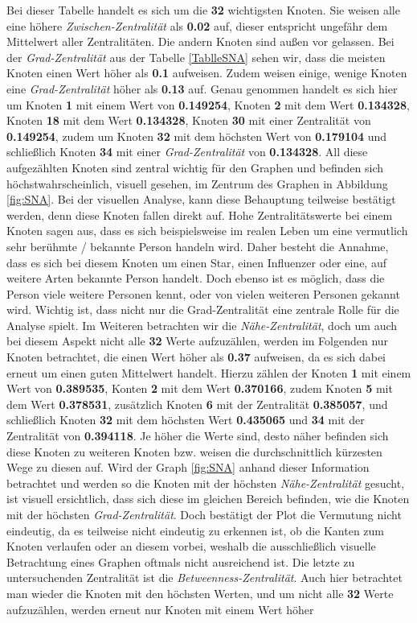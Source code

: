 \FloatBarrier
Bei dieser Tabelle handelt es sich um die \textbf{32} wichtigsten Knoten. Sie weisen alle eine höhere \textit{Zwischen-Zentralität} als \textbf{0.02} auf, dieser entspricht ungefähr dem Mittelwert aller Zentralitäten. Die andern Knoten sind außen vor gelassen.
Bei der \textit{Grad-Zentralität} aus der Tabelle \ref{TablleSNA} sehen wir, dass die meisten Knoten einen Wert höher als \textbf{0.1} aufweisen. Zudem weisen einige, wenige Knoten eine \textit{Grad-Zentralität} höher als \textbf{0.13} auf. Genau genommen handelt es sich hier um Knoten \textbf{1} mit einem Wert von \textbf{0.149254}, Knoten \textbf{2} mit dem Wert \textbf{0.134328}, Knoten \textbf{18} mit dem Wert \textbf{0.134328}, Knoten \textbf{30} mit einer Zentralität von \textbf{0.149254}, zudem um Knoten \textbf{32} mit dem höchsten Wert von \textbf{0.179104} und schließlich Knoten \textbf{34} mit einer \textit{Grad-Zentralität} von \textbf{0.134328}. All diese aufgezählten Knoten sind zentral wichtig für den Graphen und befinden sich höchstwahrscheinlich, visuell gesehen, im Zentrum des Graphen in Abbildung \ref{fig:SNA}. Bei der visuellen Analyse, kann diese Behauptung teilweise bestätigt werden, denn diese Knoten fallen direkt auf. Hohe Zentralitätswerte bei einem Knoten sagen aus, dass es sich beispielsweise im realen Leben um eine vermutlich sehr berühmte / bekannte Person handeln wird. Daher besteht die Annahme, dass es sich bei diesem Knoten um einen Star, einen Influenzer oder eine, auf weitere Arten bekannte Person handelt. Doch ebenso ist es möglich, dass die Person viele weitere Personen kennt, oder von vielen weiteren Personen gekannt wird. Wichtig ist, dass nicht nur die Grad-Zentralität eine zentrale Rolle für die Analyse spielt. Im Weiteren betrachten wir die \textit{Nähe-Zentralität}, doch um auch bei diesem Aspekt nicht alle \textbf{32} Werte aufzuzählen, werden im Folgenden nur Knoten betrachtet, die einen Wert höher als \textbf{0.37} aufweisen, da es sich dabei erneut um einen guten Mittelwert handelt. Hierzu zählen der Knoten \textbf{1} mit einem Wert von \textbf{0.389535}, Konten \textbf{2} mit dem Wert \textbf{0.370166}, zudem Knoten \textbf{5} mit dem Wert \textbf{0.378531}, zusätzlich Knoten \textbf{6} mit der Zentralität \textbf{0.385057}, und schließlich Knoten \textbf{32} mit dem höchsten Wert \textbf{0.435065} und \textbf{34} mit der Zentralität von \textbf{0.394118}. Je höher die Werte sind, desto näher befinden sich diese Knoten zu weiteren Knoten bzw. weisen die durchschnittlich kürzesten Wege zu diesen auf. Wird der Graph \ref{fig:SNA} anhand dieser Information betrachtet und werden so die Knoten mit der höchsten \textit{Nähe-Zentralität} gesucht, ist visuell ersichtlich, dass sich diese im gleichen Bereich befinden, wie die Knoten mit der höchsten \textit{Grad-Zentralität}. Doch bestätigt der Plot die Vermutung nicht eindeutig, da es teilweise nicht eindeutig zu erkennen ist, ob die Kanten zum Knoten verlaufen oder an diesem vorbei, weshalb die ausschließlich visuelle Betrachtung eines Graphen oftmals nicht ausreichend ist. Die letzte zu untersuchenden Zentralität ist die \textit{Betweenness-Zentralität}. Auch hier betrachtet man wieder die Knoten mit den höchsten Werten, und um nicht alle \textbf{32} Werte aufzuzählen, werden erneut nur Knoten mit einem Wert höher 